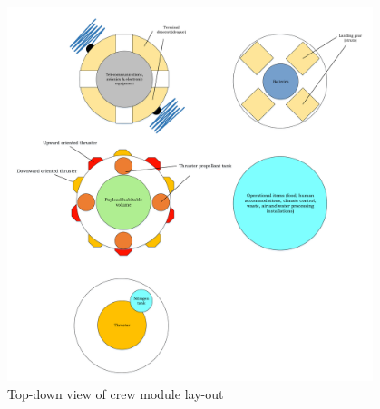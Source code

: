 \begin{figure}[h]
		\centering
		\includegraphics[width=0.95\textwidth]{./Figure/CrewModule/TopviewV2.pdf}
		\caption{Top-down view of crew module lay-out}
		\label{fig:topview}
\end{figure}



